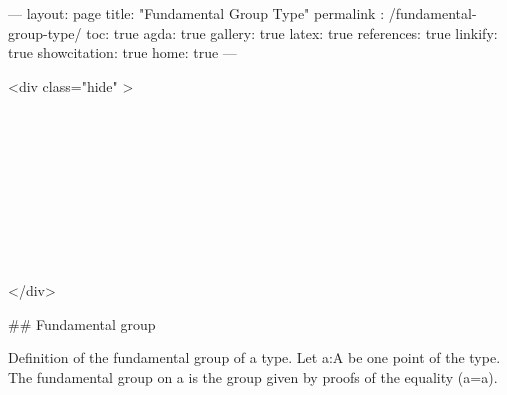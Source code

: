 ---
layout: page
title: "Fundamental Group Type"
permalink : /fundamental-group-type/
toc: true
agda: true
gallery: true
latex: true
references: true
linkify: true
showcitation: true
home: true
---


<div class="hide" >
\begin{code}%
\>[0]\AgdaSymbol{\{-\#}\AgdaSpace{}%
\AgdaSpace{}%
\AgdaSpace{}%
\AgdaSymbol{\#-\}}\<%
\\
\>[0]\AgdaSpace{}%
\AgdaSpace{}%
\<%
\\
\>[0]\AgdaSpace{}%
\AgdaSpace{}%
\<%
\\
%
\\[\AgdaEmptyExtraSkip]%
\>[0]\AgdaSpace{}%
\AgdaSpace{}%
\<%
\\
\>[0]\AgdaSpace{}%
\AgdaSpace{}%
\<%
\\
\>[0]\AgdaSpace{}%
\AgdaSpace{}%
\<%
\\
\>[0]\AgdaSpace{}%
\AgdaSpace{}%
\<%
\\
\>[0]\AgdaSpace{}%
\AgdaSpace{}%
\<%
\end{code}
</div>

## Fundamental group

Definition of the fundamental group of a type.
Let a:A be one point of the type. The fundamental group on a is the
group given by proofs of the equality (a=a).

